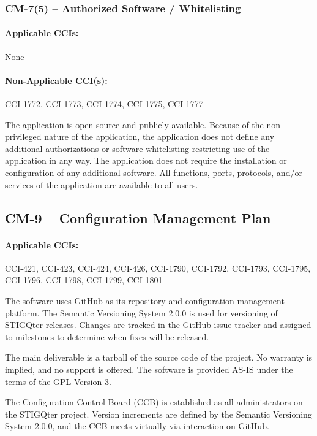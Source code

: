 \documentclass[letterpaper, 10pt, twoside]{article}
\begin{document}
\subsubsection{CM-7(5) -- Authorized Software / Whitelisting}

\paragraph{Applicable CCIs:} None

\paragraph{Non-Applicable CCI(s):} CCI-1772, CCI-1773, CCI-1774, CCI-1775, CCI-1777

The application is open-source and publicly available. Because of the non-privileged nature of the application, the application does not define any additional authorizations or software whitelisting restricting use of the application in any way. The application does not require the installation or configuration of any additional software. All functions, ports, protocols, and/or services of the application are available to all users.

\subsection{CM-9 -- Configuration Management Plan}

\paragraph{Applicable CCIs:} CCI-421, CCI-423, CCI-424, CCI-426, CCI-1790, CCI-1792, CCI-1793, CCI-1795, CCI-1796, CCI-1798, CCI-1799, CCI-1801

The software uses GitHub as its repository and configuration management platform. The Semantic Versioning System 2.0.0 is used for versioning of STIGQter releases.\autocite{preston2013semantic} Changes are tracked in the GitHub issue tracker and assigned to milestones to determine when fixes will be released.

The main deliverable is a tarball of the source code of the project. No warranty is implied, and no support is offered. The software is provided AS-IS under the terms of the GPL Version 3.

The Configuration Control Board (CCB) is established as all administrators on the STIGQter project. Version increments are defined by the Semantic Versioning System 2.0.0, and the CCB meets virtually via interaction on GitHub.
\end{document}

